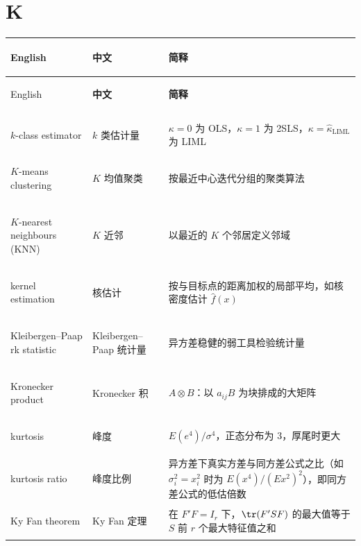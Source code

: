 \section*{K}
\begin{longtable}{@{}>{\bfseries\boldmath\raggedright\arraybackslash}p{4.6cm}>{\raggedright\arraybackslash}p{3.2cm}>{\raggedright\arraybackslash}p{\dimexpr\textwidth-7.8cm-4\tabcolsep\relax}@{}}
\toprule
English & \textbf{中文} & \textbf{简释}\\
\midrule
\endfirsthead
\toprule
English & \textbf{中文} & \textbf{简释}\\
\midrule
\endhead
\midrule
\multicolumn{3}{r@{}}{\footnotesize\itshape （续下页）}\\
\endfoot
\bottomrule
\endlastfoot
$k$-class estimator & $k$ 类估计量 & $\kappa=0$ 为 OLS，$\kappa=1$ 为 2SLS，$\kappa=\hat\kappa_{\mathrm{LIML}}$ 为 LIML \\
$K$-means clustering & $K$ 均值聚类 & 按最近中心迭代分组的聚类算法 \\
$K$-nearest neighbours (KNN) & $K$ 近邻 & 以最近的 $K$ 个邻居定义邻域 \\
kernel estimation & 核估计 & 按与目标点的距离加权的局部平均，如核密度估计 $\hat f(x)$ \\
Kleibergen--Paap rk statistic & Kleibergen--Paap 统计量 & 异方差稳健的弱工具检验统计量 \\
Kronecker product & Kronecker 积 & $A\otimes B$：以 $a_{ij}B$ 为块排成的大矩阵 \\
kurtosis & 峰度 & $E(e^4)/\sigma^4$，正态分布为 3，厚尾时更大 \\
kurtosis ratio & 峰度比例 & 异方差下真实方差与同方差公式之比（如 $\sigma_i^2=x_i^2$ 时为 $E(x^4)/(Ex^2)^2$），即同方差公式的低估倍数 \\
Ky Fan theorem & Ky Fan 定理 & 在 $F'F=I_r$ 下，$\tr(F'SF)$ 的最大值等于 $S$ 前 $r$ 个最大特征值之和 \\
\end{longtable}

\par{}\ifdim\dimexpr\pagegoal-\pagetotal\relax<16\baselineskip\newpage\fi
